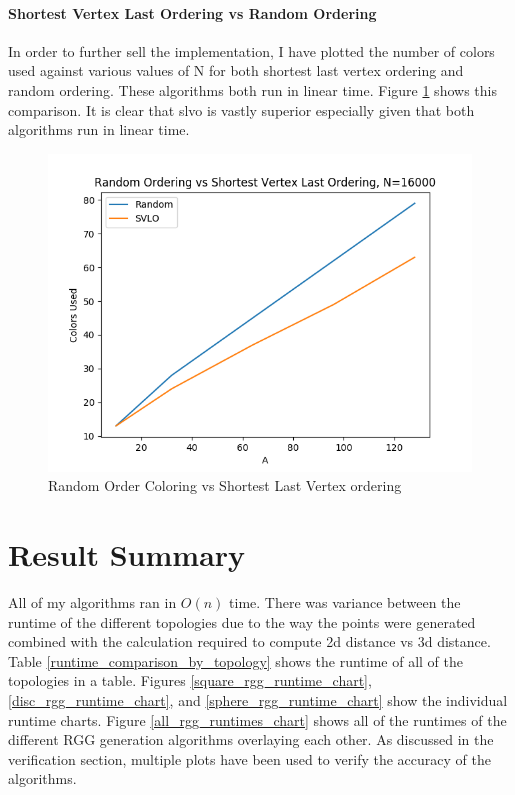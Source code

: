 \documentclass{article}
\begin{document}
    \paragraph{Shortest Vertex Last Ordering vs Random Ordering}
    In order to further sell the implementation, I have plotted the number of colors used against various values of N for both shortest last vertex ordering and random ordering.
    These algorithms both run in linear time.
    Figure \ref{random_coloring_vs_slvo} shows this comparison.
    It is clear that slvo is vastly superior especially given that both algorithms run in linear time.

    \begin{figure}
      \centering
      \label{random_coloring_vs_slvo}
      \includegraphics[width=1 \textwidth]{comparison/number_colors.png}
      \caption{Random Order Coloring vs Shortest Last Vertex ordering}
    \end{figure}


\section{Result Summary}
  All of my algorithms ran in $O(n)$ time.
  There was variance between the runtime of the different topologies due to the way the points were generated combined with the calculation required to compute 2d distance vs 3d distance.
  Table \ref{runtime_comparison_by_topology} shows the runtime of all of the topologies in a table.
  Figures \ref{square_rgg_runtime_chart}, \ref{disc_rgg_runtime_chart}, and \ref{sphere_rgg_runtime_chart} show the individual runtime charts.
  Figure \ref{all_rgg_runtimes_chart} shows all of the runtimes of the different RGG generation algorithms overlaying each other.
  As discussed in the verification section, multiple plots have been used to verify the accuracy of the algorithms.
\end{document}
